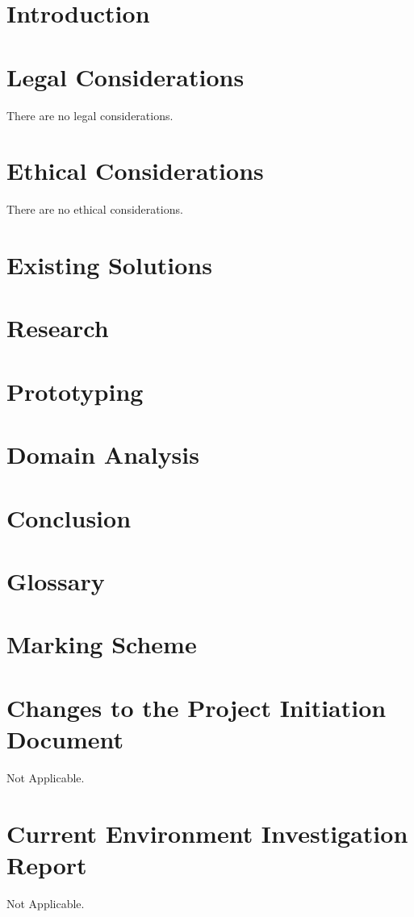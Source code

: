 \documentclass[a4paper,12pt]{report}
\begin{document}
\chapter{Introduction}

\chapter{Legal Considerations}
There are no legal considerations.
\chapter{Ethical Considerations}
There are no ethical considerations.
\chapter{Existing Solutions}

\chapter{Research}

\chapter{Prototyping}

\chapter{Domain Analysis}

\chapter{Conclusion}


\printbibliography[heading=bibintoc]

\appendix
\chapter{Glossary}
\printglossaries
\chapter{Marking Scheme}
\chapter{Changes to the Project Initiation Document}
Not Applicable.
\chapter{Current Environment Investigation Report}
Not Applicable.
\end{document}
